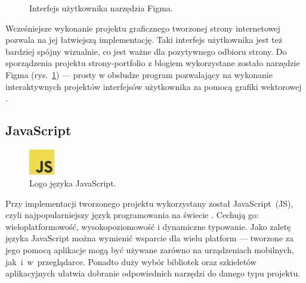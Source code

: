 \documentclass[a4paper, 12pt]{article}
\numberwithin{figure}{section}
\begin{document}
\begin{sloppypar}
\begin{figure}[H] 
    \centering
   \caption{Interfejs użytkownika narzędzia Figma.}
   \label{fig:figma-1.jpg}
\end{figure}

Wcześniejsze wykonanie projektu graficznego tworzonej strony internetowej pozwala na jej łatwiejszą implementację. Taki interfejs użytkownika jest też bardziej spójny wizualnie, co jest ważne dla pozytywnego odbioru strony. Do sporządzenia projektu strony-portfolio z blogiem wykorzystane zostało narzędzie Figma (rys.~\ref{fig:figma-1.jpg}) --- prosty w obsłudze program pozwalający na wykonanie interaktywnych projektów interfejsów użytkownika za pomocą grafiki wektorowej \cite{figma}. 


\subsection*{JavaScript}

\begin{figure}[H] 
    \centering
        \includegraphics[width=0.1\textwidth]{images/js-logo.png}
   \caption{Logo języka JavaScript.}
\end{figure}

Przy implementacji tworzonego projektu wykorzystany został JavaScript~(JS), czyli najpopularniejszy język programowania na świecie \cite{js}. Cechują go: wieloplatformowość, wysokopoziomowość i dynamiczne typowanie. Jako zaletę języka JavaScript można wymienić wsparcie dla wielu platform --- tworzone za jego pomocą aplikacje mogą być używane zarówno na urządzeniach mobilnych, jak~i~w~przeglądarce. Ponadto duży wybór bibliotek oraz szkieletów aplikacyjnych ułatwia dobranie odpowiednich narzędzi do danego typu projektu.


\end{sloppypar}
\end{document}
